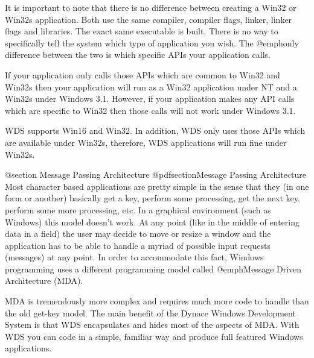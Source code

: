 It is important to note that there is no difference between creating a
Win32 or Win32s application.  Both use the same compiler, compiler
flags, linker, linker flags and libraries.  The exact same executable
is built.  There is no way to specifically tell the system which type of
application you wish.  The @emph{only} difference between the two is
which specific APIs your application calls.

If your application only calls those APIs which are common to Win32
and Win32s then your application will run as a Win32 application under
NT and a Win32s under Windows 3.1.  However, if your application makes
any API calls which are specific to Win32 then those calls will not
work under Windows 3.1.

WDS supports Win16 and Win32.  In addition, WDS only uses those APIs
which are available under Win32s, therefore, WDS applications will
run fine under Win32s.

@section Message Passing Architecture
@pdfsection{Message Passing Architecture}
Most character based applications are pretty simple in the sense that
they (in one form or another) basically get a key, perform some processing,
get the next key, perform some more processing, etc.  In a graphical
environment (such as Windows) this model doesn't work.  At any point
(like in the middle of entering data in a field) the user may decide
to move or resize a window and the application has to be able to
handle a myriad of possible input requests (messages) at any point.
In order to accommodate this fact, Windows programming uses a different
programming model called @emph{Message Driven Architecture} (MDA).

MDA is tremendously more complex and requires much more code to handle
than the old get-key model.  The main benefit of the Dynace Windows
Development System is that WDS encapsulates and hides most of the
aspects of MDA.  With WDS you can code in a simple, familiar way and
produce full featured Windows applications.

